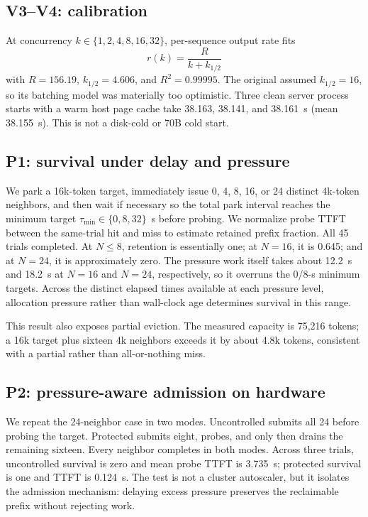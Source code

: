 \documentclass[sigconf,nonacm]{acmart}
\begin{document}
\subsection{V3--V4: calibration}

At concurrency $k\in\{1,2,4,8,16,32\}$, per-sequence output rate fits
\begin{equation}
  r(k)=\frac{R}{k+k_{1/2}}
  \label{eq:batch}
\end{equation}
with $R=156.19$, $k_{1/2}=4.606$, and $R^2=0.99995$. The original assumed
$k_{1/2}=16$, so its batching model was materially too optimistic. Three clean
server process starts with a warm host page cache take 38.163, 38.141, and
38.161~s (mean 38.155~s). This is not a disk-cold or 70B cold start.

\subsection{P1: survival under delay and pressure}

We park a 16k-token target, immediately issue 0, 4, 8, 16, or 24 distinct
4k-token neighbors, and then wait if necessary
so the total park interval reaches the minimum target
$\tau_{\min}\in\{0,8,32\}$~s before probing. We normalize probe TTFT between
the same-trial hit and miss to estimate retained prefix fraction. All 45 trials
completed. At $N\le8$, retention is essentially one; at $N=16$, it is 0.645;
and at $N=24$, it is approximately zero. The pressure work itself takes about
12.2~s and 18.2~s at $N=16$ and $N=24$, respectively, so it overruns the
0/8-s minimum targets. Across the distinct elapsed times available at each
pressure level, allocation pressure rather than wall-clock age determines
survival in this range.

This result also exposes partial eviction. The measured capacity is 75,216
tokens; a 16k target plus sixteen 4k neighbors exceeds it by about 4.8k tokens,
consistent with a partial rather than all-or-nothing miss.

\subsection{P2: pressure-aware admission on hardware}

We repeat the 24-neighbor case in two modes. Uncontrolled submits all 24 before
probing the target. Protected submits eight, probes, and only then drains the
remaining sixteen. Every neighbor completes in both modes. Across three trials,
uncontrolled survival is zero and mean probe TTFT is 3.735~s; protected
survival is one and TTFT is 0.124~s. The test is not a cluster autoscaler, but
it isolates the admission mechanism: delaying excess pressure preserves the
reclaimable prefix without rejecting work.
\end{document}
